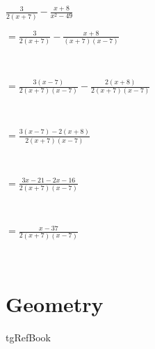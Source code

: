 \begin{enumerate} [leftmargin=0cm]
\begin{tasks}[label=(\arabic*), after-item-skip=2pt,after-skip=3pt, label-width=4ex]
            \begin{envAnswer} { }\end{envAnswer}
	
	
	
    \task  $ \frac{3}{2(x+7)}-\frac{x+8}{x^2-49}    $   \\   
	        \begin{envWorkedSolL} { $   =\frac{3}{2(x+7)}-\frac{x+8}{(x+7)(x-7)}                          $ }\end{envWorkedSolL}    \\
	        \begin{envWorkedSolL} { $   = \frac{3(x-7)}{2(x+7)(x-7)}-\frac{2(x+8)}{2(x+7)(x-7)}           $ }\end{envWorkedSolL}    \\
	        \begin{envWorkedSolL} { $   = \frac{3(x-7)-2(x+8)}{2(x+7)(x-7)}                               $ }\end{envWorkedSolL}    \\             
	        \begin{envWorkedSolL} { $   = \frac{3x-21-2x-16}{2(x+7)(x-7)}                                 $ }\end{envWorkedSolL}    \\
	        \begin{envWorkedSolS} { $   = \frac{x-37}{2(x+7)(x-7)}                                        $ }\end{envWorkedSolS}    \\            
	        \begin{envAnswer}     { }\end{envAnswer}


\end{tasks}


\end{enumerate}

\chapter{Geometry}



\begin{taggedblock}{tgRefBook}
\end{taggedblock}

